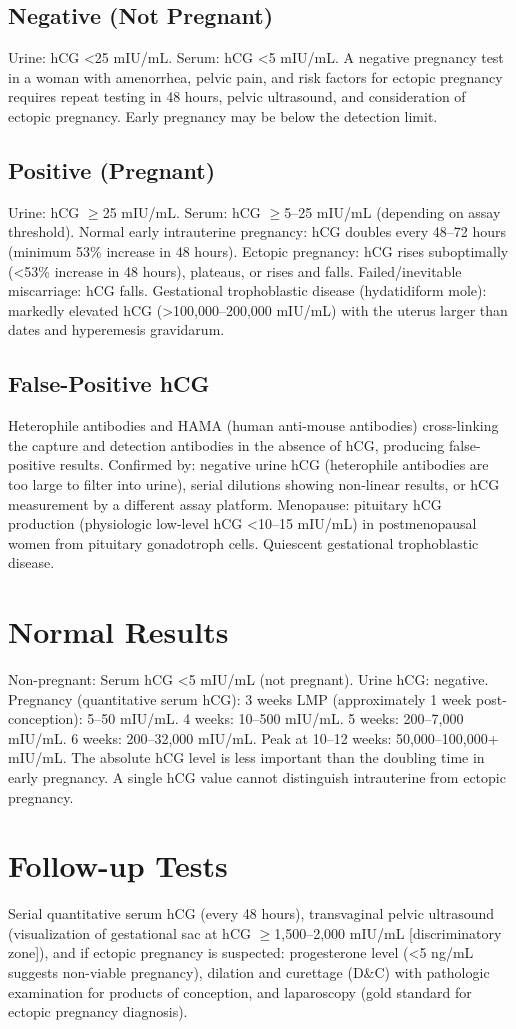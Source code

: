 \subsection*{Negative (Not Pregnant)}
Urine: hCG <25 mIU/mL. Serum: hCG <5 mIU/mL. A negative pregnancy test in a woman with amenorrhea, pelvic pain, and risk factors for ectopic pregnancy requires repeat testing in 48 hours, pelvic ultrasound, and consideration of ectopic pregnancy. Early pregnancy may be below the detection limit.
\subsection*{Positive (Pregnant)}
Urine: hCG $\geq$25 mIU/mL. Serum: hCG $\geq$5--25 mIU/mL (depending on assay threshold). Normal early intrauterine pregnancy: hCG doubles every 48--72 hours (minimum 53\% increase in 48 hours). Ectopic pregnancy: hCG rises suboptimally (<53\% increase in 48 hours), plateaus, or rises and falls. Failed/inevitable miscarriage: hCG falls. Gestational trophoblastic disease (hydatidiform mole): markedly elevated hCG (>100,000--200,000 mIU/mL) with the uterus larger than dates and hyperemesis gravidarum.
\subsection*{False-Positive hCG}
Heterophile antibodies and HAMA (human anti-mouse antibodies) cross-linking the capture and detection antibodies in the absence of hCG, producing false-positive results. Confirmed by: negative urine hCG (heterophile antibodies are too large to filter into urine), serial dilutions showing non-linear results, or hCG measurement by a different assay platform. Menopause: pituitary hCG production (physiologic low-level hCG <10--15 mIU/mL) in postmenopausal women from pituitary gonadotroph cells. Quiescent gestational trophoblastic disease.
\section*{Normal Results}
Non-pregnant: Serum hCG <5 mIU/mL (not pregnant). Urine hCG: negative. Pregnancy (quantitative serum hCG): 3 weeks LMP (approximately 1 week post-conception): 5--50 mIU/mL. 4 weeks: 10--500 mIU/mL. 5 weeks: 200--7,000 mIU/mL. 6 weeks: 200--32,000 mIU/mL. Peak at 10--12 weeks: 50,000--100,000+ mIU/mL. The absolute hCG level is less important than the doubling time in early pregnancy. A single hCG value cannot distinguish intrauterine from ectopic pregnancy.
\section*{Follow-up Tests}
Serial quantitative serum hCG (every 48 hours), transvaginal pelvic ultrasound (visualization of gestational sac at hCG $\geq$1,500--2,000 mIU/mL [discriminatory zone]), and if ectopic pregnancy is suspected: progesterone level (<5 ng/mL suggests non-viable pregnancy), dilation and curettage (D\&C) with pathologic examination for products of conception, and laparoscopy (gold standard for ectopic pregnancy diagnosis).
